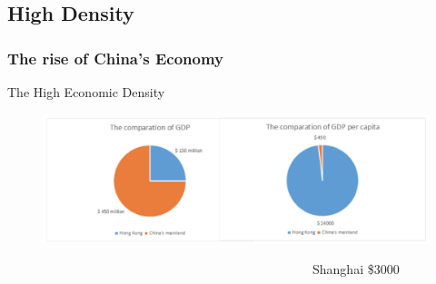 \documentclass[slidestop,uncompress,mathsans, 12pt]{beamer}
\begin{document}
\subsection{High Density}
\begin{frame}
\frametitle{The rise of China's Economy}
The High Economic Density\\
\bigskip
\bigskip
\begin{figure}[h]
\raggedleft
\includegraphics[width=1\textwidth]{hk5.jpg}
\label{threadsVsSync}
\end{figure}
~~~~~~~~~~~~~~~~~~~~~~~~~~~~~~~~~~~~~~~~~~~~~~~~Shanghai \$$3000$
\end{frame}
\end{document}
